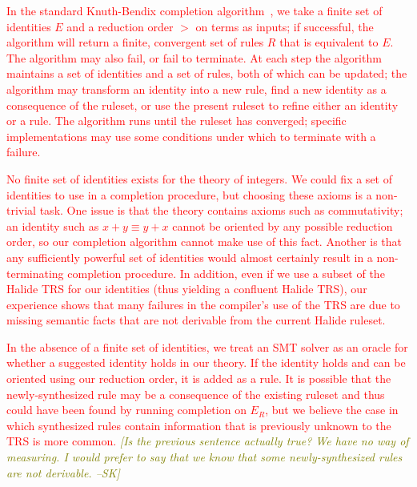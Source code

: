 \documentclass[acmsmall,review]{acmart}\settopmatter{printfolios=true,printccs=false,printacmref=false}
\newcommand{\sak}[1]{\textcolor{olive}{\textit{[{#1} --SK]}}}
\newcommand{\modified}[1]{\textcolor{red}{{#1}}}
\begin{document}
\modified{In the standard Knuth-Bendix completion algorithm~\cite{knuth1983simple}, we take a
finite set of identities $E$ and a reduction order $>$ on terms as inputs; if successful, the
algorithm will return a finite, convergent set of rules $R$ that is equivalent to 
$E$. The algorithm may also fail, or fail to terminate. At each step the algorithm
maintains a set of identities and a set of rules, both of which can be updated; the 
algorithm may transform an identity into a new rule, find a new identity as a 
consequence of the ruleset, or use the present ruleset to refine either an identity 
or a rule. The algorithm runs until the ruleset has converged; specific implementations
may use some conditions under which to terminate with a failure.}

\modified{No finite set of identities exists for the theory of integers. We could
fix a set of identities to use in a completion procedure, but choosing these axioms
is a non-trivial task. One issue is that the theory contains axioms such as commutativity;
an identity such as $x + y \equiv y + x$ cannot be oriented by any possible reduction 
order, so our completion algorithm cannot make use of this fact. Another is that any
sufficiently powerful set of identities would almost certainly result in a non-terminating
completion procedure.  In addition, even if we use a subset of the Halide TRS for our
identities (thus yielding a confluent Halide TRS), our experience shows that many
failures in the compiler's use of the TRS are due to missing semantic facts that are not
derivable from the current Halide ruleset.}


\modified{%
In the absence of a finite set of identities, we
treat an SMT solver as an oracle for whether a suggested identity 
holds in our theory. If the identity holds and can be oriented using our reduction order, 
it is added as a rule. It is possible that the newly-synthesized rule may be a consequence 
of the existing ruleset and thus could have been found by running completion on $E_R$, 
but we believe the case in which synthesized rules contain information that is previously 
unknown to the TRS is more common.}
\sak{Is the previous sentence actually true?  We have no way of measuring.  I would prefer to
say that we know that some newly-synthesized rules are not derivable.}
\end{document}
